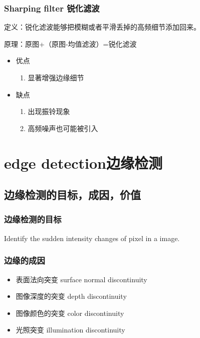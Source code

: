 \documentclass[UTF8]{ctexart}
\begin{document}
\subsubsection{Sharping filter 锐化滤波}

定义：锐化滤波能够把模糊或者平滑丢掉的高频细节添加回来。

原理：原图+（原图-均值滤波）=锐化滤波

\begin{itemize}

    \item 优点
    \begin{enumerate}
        \item 显著增强边缘细节
    \end{enumerate}

    \item 缺点
    \begin{enumerate}
        \item 出现振铃现象
        \item 高频噪声也可能被引入
    \end{enumerate}
\end{itemize}


\section{edge detection边缘检测}
\subsection{边缘检测的目标，成因，价值}
\subsubsection{边缘检测的目标}

Identify the sudden intensity changes of pixel in a image.

\subsubsection{边缘的成因}
\begin{itemize}
    \item 表面法向突变 surface normal discontinuity
    \item 图像深度的突变 depth discontinuity
    \item 图像颜色的突变 color discontinuity
    \item 光照突变 illumination discontinuity
\end{itemize}
\end{document}
